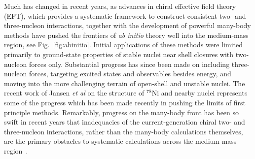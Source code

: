 \documentclass[10pt]{article}
\begin{document}
Much has changed in recent years, as advances in chiral effective
field theory (EFT), which provides a systematic framework to construct
consistent two- and three-nucleon
interactions,
together with the development of powerful many-body methods have
pushed the
frontiers of \emph{ab initio} theory well into the medium-mass
region, see Fig.~\ref{fig:abinitio}. 
Initial applications of these methods were limited primarily to ground-state
properties of stable nuclei near shell closures with two-nucleon
forces only. Substantial progress has since been made on including
three-nucleon forces, targeting excited states and observables besides
energy, and moving into the more
challenging terrain of open-shell and unstable
nuclei. %
The recent work of Jansen {\em et al} \cite{jansenprl2016} on the structure of $^{78}$Ni and nearby nuclei represents some of the progress which has been made recently in pushing the limits of first principle methods. Remarkably,
progress on the many-body front has been so swift in recent years that
inadequacies of the current-generation chiral two- and three-nucleon
interactions, rather than the many-body calculations themselves, are
the primary obstacles to systematic calculations across the
medium-mass region~\cite{Ekstrom2015}.
\end{document}
